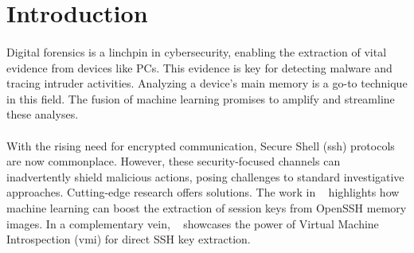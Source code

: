 \section{Introduction}\label{chap:introduction}

\begin{comment}
Motivate your research and outline the research gap in this chapter. Why is your thesis relevant and what do you address, what has not been addressed before. 

General Requirements to the thesis:

\begin{itemize}
	\item 60 pages of content in this format. Content does not include table of content, lists, appendices etc.
	\item Proper scientific referencing
	\item Introduction and Background should be less than 50\% of the thesis
	\item Images should be readable and in the proper size. 
\end{itemize}
\end{comment}


\paragraph*{}Digital forensics is a linchpin in cybersecurity, enabling the extraction of vital evidence from devices like PCs. This evidence is key for detecting malware and tracing intruder activities. Analyzing a device's main memory is a go-to technique in this field. The fusion of machine learning promises to amplify and streamline these analyses.

\paragraph*{}With the rising need for encrypted communication, Secure Shell (\acrshort{ssh}) protocols are now commonplace. However, these security-focused channels can inadvertently shield malicious actions, posing challenges to standard investigative approaches. Cutting-edge research offers solutions. The work in ~\cite*{fellicious_smartkex_2022} highlights how machine learning can boost the extraction of session keys from OpenSSH memory images. In a complementary vein, ~\cite*{sentanoe_sshkex_2022} showcases the power of Virtual Machine Introspection (\acrshort{vmi}) for direct SSH key extraction.

